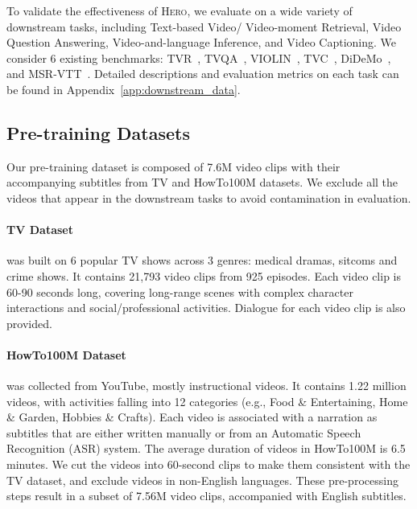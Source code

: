 \documentclass[11pt,a4paper]{article}
\begin{document}
To validate the effectiveness of \textsc{Hero}, we evaluate on a wide variety of downstream tasks, including Text-based Video/ Video-moment Retrieval, Video Question Answering, Video-and-language Inference, and Video Captioning. We consider 6 existing benchmarks: TVR~\citep{lei2020tvr}, TVQA~\citep{lei2018tvqa}, VIOLIN~\citep{liu2020violin}, TVC~\citep{lei2020tvr}, DiDeMo~\citep{didemo}, and MSR-VTT~\citep{xu2016msr-vtt}. Detailed descriptions and evaluation metrics on each task can be found in Appendix~\ref{app:downstream_data}.


\subsection{Pre-training Datasets}
Our pre-training dataset is composed of 7.6M video clips with their accompanying subtitles from TV and HowTo100M datasets. We exclude all the videos that appear in the downstream tasks to avoid contamination in evaluation. 

\paragraph{TV Dataset}\citep{lei2018tvqa} was built on 6 popular TV shows across 3 genres: medical dramas, sitcoms and crime shows. It contains 21,793 video clips from 925 episodes. Each video clip is 60-90 seconds long, covering long-range scenes with complex character interactions and social/professional activities. Dialogue for each video clip is also provided.

\paragraph{HowTo100M Dataset}\citep{miech2019howto100m} was collected from YouTube, mostly instructional videos. It contains 1.22 million videos, with activities falling into 12 categories (e.g., Food \& Entertaining, Home \& Garden, Hobbies \& Crafts). Each video is associated with a narration as subtitles that are either written manually or from an Automatic Speech Recognition (ASR) system. The average duration of videos in HowTo100M is 6.5 minutes. We cut the videos into 60-second clips to make them consistent with the TV dataset, and exclude videos in non-English languages. These pre-processing steps result in a subset of 7.56M video clips, accompanied with English subtitles.
\end{document}
